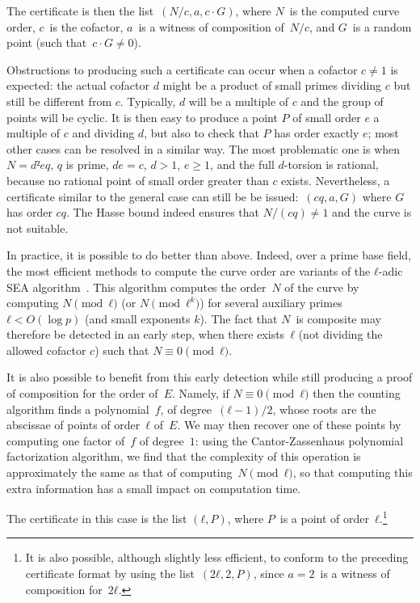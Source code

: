 \documentclass[twocolumn,letterpaper,10pt]{article}
\begin{document}
The certificate is then the list~$(N/c, a, c · G)$,
where $N$~is the computed curve order, $c$~is the cofactor,
$a$~is a witness of composition of~$N/c$,
and $G$~is a random point (such that~$c · G ≠ 0$).

\smallskip

Obstructions to producing such a certificate can occur
when a cofactor $c \neq 1$ is expected:
the actual cofactor $d$ might be a product of small primes dividing $c$
but still be different from $c$.
Typically, $d$ will be a multiple of $c$
and the group of points will be cyclic.
It is then easy to produce a point $P$ of small order $e$
a multiple of $c$ and dividing $d$, but also
to check that $P$ has order exactly $e$;
most other cases can be resolved in a similar way.
The most problematic one is when $N = d² e q$, $q$ is prime,
$d e = c$, $d > 1$, $e \geq 1$,
and the full $d$-torsion is rational,
because no rational point of small order greater than $c$ exists.
Nevertheless, a certificate similar
to the general case can still be be issued:~$(c q, a, G)$
where $G$ has order $c q$.
The Hasse bound indeed ensures that $N / (cq) \neq 1$
and the curve is not suitable.

\smallskip

In practice, it is possible to do better than above.
Indeed, over a prime base field,
the most efficient methods to compute the curve order are
variants of the $ℓ$-adic SEA algorithm~\cite{mc1985schoof,
jtnb1995schoof,smf2008cl}.
This algorithm computes the order~$N$ of the curve
by computing $N \pmod{ℓ}$ (or $N \pmod{ℓ^k}$) for several
auxiliary primes~$ℓ < O(\log p)$ (and small exponents $k$).
The fact that $N$~is composite may therefore be detected
in an early step,
when there exists~$ℓ$ (not dividing the allowed cofactor $c$)
such that $N ≡ 0 \pmod{ℓ}$.

It is also possible to benefit from this early detection
while still producing a proof of composition for the order of~$E$.
Namely, if $N ≡ 0 \pmod{ℓ}$ then
the counting algorithm finds a polynomial~$f$, of degree~$(ℓ-1)/2$,
whose roots are the abscissae of points of order~$ℓ$ of~$E$.
We may then recover one of these points by
computing one factor of~$f$ of degree~$1$:
using the Cantor-Zassenhaus polynomial factorization algorithm,
we find that the complexity of this operation
is approximately the same as that of computing~$N \pmod{ℓ}$,
so that computing this extra information
has a small impact on computation time.

The certificate in this case is the list $(ℓ, P)$,
where $P$~is a point of order~$ℓ$.\footnote{%
It is also possible, although slightly less efficient,
to conform to the preceding certificate format
by using the list~$(2 ℓ, 2, P)$,
since $a = 2$~is a witness of composition for~$2ℓ$.}
\end{document}
